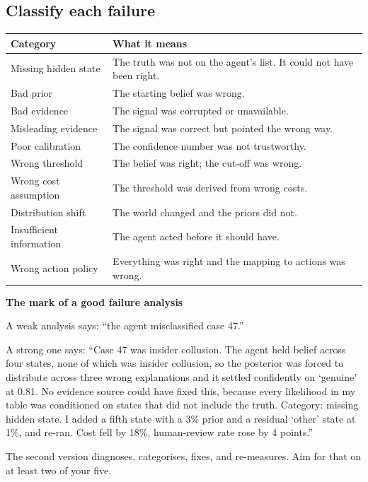 \documentclass[11pt,a4paper]{article}
\newcommand{\boxtitle}[1]{{\bfseries #1}\par\vspace{2pt}}
\begin{document}
\subsection{Classify each failure}

\begin{center}
\begin{tabular}{@{}L{3.6cm}L{11.0cm}@{}}
\toprule
\textbf{Category} & \textbf{What it means} \\
\midrule
Missing hidden state & The truth was not on the agent's list. It could not have been right. \\
Bad prior & The starting belief was wrong. \\
Bad evidence & The signal was corrupted or unavailable. \\
Misleading evidence & The signal was correct but pointed the wrong way. \\
Poor calibration & The confidence number was not trustworthy. \\
Wrong threshold & The belief was right; the cut-off was wrong. \\
Wrong cost assumption & The threshold was derived from wrong costs. \\
Distribution shift & The world changed and the priors did not. \\
Insufficient information & The agent acted before it should have. \\
Wrong action policy & Everything was right and the mapping to actions was wrong. \\
\bottomrule
\end{tabular}
\end{center}

\begin{sbbox}
\boxtitle{The mark of a good failure analysis}
A weak analysis says: ``the agent misclassified case 47.''

A strong one says: ``Case 47 was insider collusion. The agent held belief across four states,
none of which was insider collusion, so the posterior was forced to distribute across three wrong
explanations and it settled confidently on `genuine' at 0.81. No evidence source could have
fixed this, because every likelihood in my table was conditioned on states that did not include
the truth. Category: missing hidden state. I added a fifth state with a 3\% prior and a residual
`other' state at 1\%, and re-ran. Cost fell by 18\%, human-review rate rose by 4 points.''

The second version diagnoses, categorises, fixes, and re-measures. Aim for that on at least two
of your five.
\end{sbbox}
\end{document}
